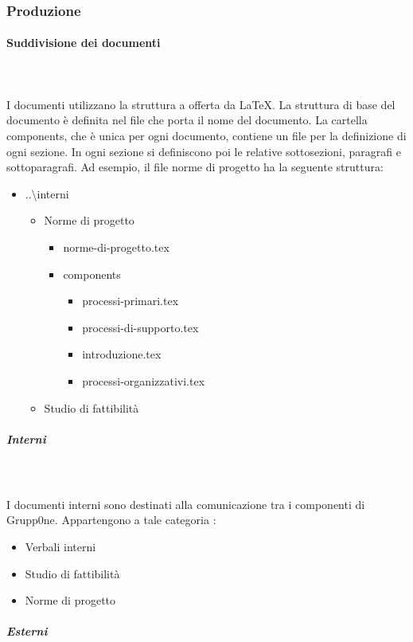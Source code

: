 \documentclass[../norme-di-progetto.tex]{subfiles}
\begin{document}
\subsubsection{Produzione}
\paragraph{Suddivisione dei documenti}\mbox{}\\
\\I documenti utilizzano la struttura a  offerta da \LaTeX. La struttura di base del documento è definita nel file che porta il nome del documento. La cartella components, che è unica per ogni documento, contiene un file per la definizione di ogni sezione. In ogni sezione si definiscono poi le relative sottosezioni, paragrafi e sottoparagrafi.
Ad esempio, il file norme di progetto ha la seguente struttura:
\begin{itemize}
	\item ..\textbackslash interni
	\begin{itemize}
	\item Norme di progetto
		 \begin{itemize}
		 	\item norme-di-progetto.tex
		 	\item components
		 	\begin{itemize}
		 		\item processi-primari.tex
		 		\item processi-di-supporto.tex
		 		\item introduzione.tex
		 		\item processi-organizzativi.tex
		 	\end{itemize}
		 \end{itemize}
	\item Studio di fattibilità
	\end{itemize}
\end{itemize}
\subparagraph{Interni}\mbox{}\\
\label{subp:interni}
\\ I documenti interni sono destinati alla comunicazione tra i componenti di Grupp0ne. Appartengono a tale categoria :
\begin{itemize}
	\item Verbali interni
	\item Studio di fattibilità
	\item Norme di progetto
\end{itemize}
\subparagraph{Esterni}\mbox{}\\
\end{document}
